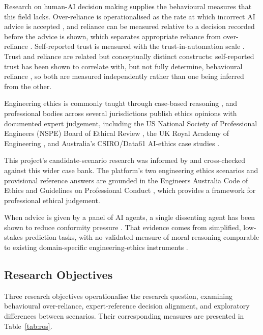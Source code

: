 \documentclass[conference]{IEEEtran}
\begin{document}
Research on human-AI decision making supplies the behavioural measures that this field lacks. Over-reliance is operationalised as the rate at which incorrect AI advice is accepted \cite{bucinca2021trustorthink}, and reliance can be measured relative to a decision recorded before the advice is shown, which separates appropriate reliance from over-reliance \cite{schemmer2023appropriatereliance}. Self-reported trust is measured with the trust-in-automation scale \cite{jian2000trustautomation}. Trust and reliance are related but conceptually distinct constructs: self-reported trust has been shown to correlate with, but not fully determine, behavioural reliance \cite{klingbeil2024trustreliance}, so both are measured independently rather than one being inferred from the other.

Engineering ethics is commonly taught through case-based reasoning \cite{hillis2026aiethics, bairaktarova2015engineeringethics}, and professional bodies across several jurisdictions publish ethics opinions with documented expert judgement, including the US National Society of Professional Engineers (NSPE) Board of Ethical Review \cite{nspe2026ber}, the UK Royal Academy of Engineering \cite{raeng2011ethicsguide}, and Australia's CSIRO/Data61 AI-ethics case studies \cite{dawson2019aiethicsframework}. 

This project's candidate-scenario research was informed by and cross-checked against this wider case bank. The platform's two engineering ethics scenarios and provisional reference answers are grounded in the Engineers Australia Code of Ethics and Guidelines on Professional Conduct \cite{engineersaustralia2022code}, which provides a framework for professional ethical judgement.

When advice is given by a panel of AI agents, a single dissenting agent has been shown to reduce conformity pressure \cite{tsuchiya2026multiaiadvice}. That evidence comes from simplified, low-stakes prediction tasks, with no validated measure of moral reasoning comparable to existing domain-specific engineering-ethics instruments \cite{stransky2023processsafety}.

\subsection{Research Objectives}

Three research objectives operationalise the research question, examining behavioural over-reliance, expert-reference decision alignment, and exploratory differences between scenarios. Their corresponding measures are presented in Table~\ref{tab:ros}.
\end{document}
